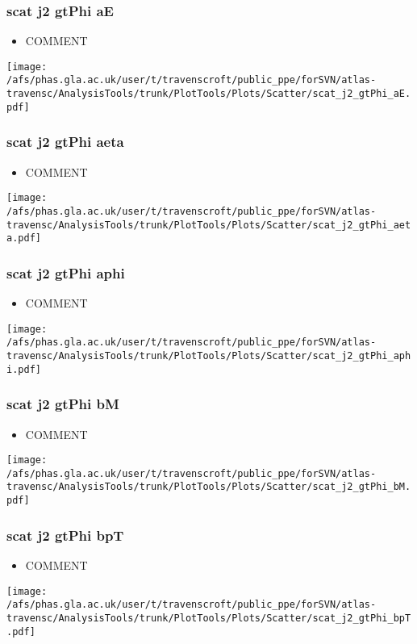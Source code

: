 \documentclass{beamer}
\begin{document}
\begin{frame}
\frametitle{scat j2 gtPhi aE}
\begin{itemize}
\item COMMENT
\end{itemize}
\begin{center}
\texttt{[image: /afs/phas.gla.ac.uk/user/t/travenscroft/public\_ppe/forSVN/atlas-travensc/AnalysisTools/trunk/PlotTools/Plots/Scatter/scat\_j2\_gtPhi\_aE.pdf]}
\end{center}
\end{frame}

\begin{frame}
\frametitle{scat j2 gtPhi aeta}
\begin{itemize}
\item COMMENT
\end{itemize}
\begin{center}
\texttt{[image: /afs/phas.gla.ac.uk/user/t/travenscroft/public\_ppe/forSVN/atlas-travensc/AnalysisTools/trunk/PlotTools/Plots/Scatter/scat\_j2\_gtPhi\_aeta.pdf]}
\end{center}
\end{frame}

\begin{frame}
\frametitle{scat j2 gtPhi aphi}
\begin{itemize}
\item COMMENT
\end{itemize}
\begin{center}
\texttt{[image: /afs/phas.gla.ac.uk/user/t/travenscroft/public\_ppe/forSVN/atlas-travensc/AnalysisTools/trunk/PlotTools/Plots/Scatter/scat\_j2\_gtPhi\_aphi.pdf]}
\end{center}
\end{frame}

\begin{frame}
\frametitle{scat j2 gtPhi bM}
\begin{itemize}
\item COMMENT
\end{itemize}
\begin{center}
\texttt{[image: /afs/phas.gla.ac.uk/user/t/travenscroft/public\_ppe/forSVN/atlas-travensc/AnalysisTools/trunk/PlotTools/Plots/Scatter/scat\_j2\_gtPhi\_bM.pdf]}
\end{center}
\end{frame}

\begin{frame}
\frametitle{scat j2 gtPhi bpT}
\begin{itemize}
\item COMMENT
\end{itemize}
\begin{center}
\texttt{[image: /afs/phas.gla.ac.uk/user/t/travenscroft/public\_ppe/forSVN/atlas-travensc/AnalysisTools/trunk/PlotTools/Plots/Scatter/scat\_j2\_gtPhi\_bpT.pdf]}
\end{center}
\end{frame}
\end{document}

